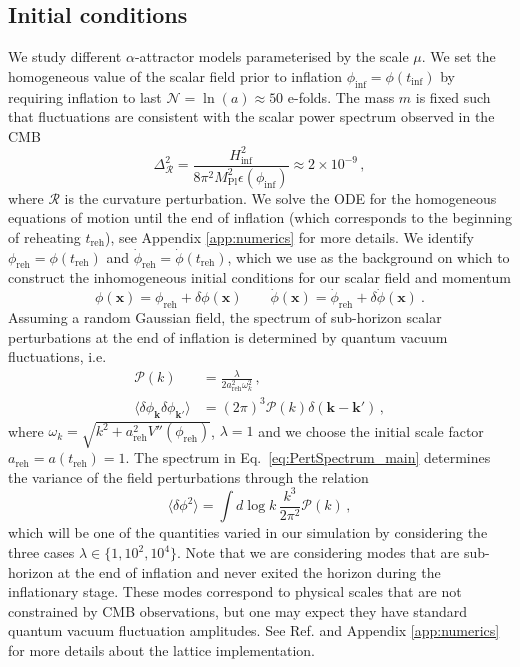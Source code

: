 \documentclass[
    reprint,
    preprintnumbers,
    superscriptaddress,
    nofootinbib,
     amsmath,amssymb,
     aps,
     prd,
    floatfix,
    ]{revtex4-2}
\newcommand{\mpl}{M_\mathrm{Pl}}
\newcommand{\reh}{_\mathrm{reh}}
\begin{document}
\subsection{Initial conditions}

We study different $\alpha$-attractor models parameterised by the scale $\mu$. We set the homogeneous value of the scalar field prior to inflation $\phi_\mathrm{inf}=\phi(t_\mathrm{inf})$ by requiring inflation to last $\mathcal{N}=\ln(a) \approx 50$ e-folds. The mass $m$ is fixed such that fluctuations are consistent with the scalar power spectrum observed in the CMB \cite{Planck:2018jri}
\begin{equation}
    \Delta_{\mathcal R}^2 = \frac{H_\mathrm{inf}^2}{8\pi^2 \mpl^2 \epsilon(\phi_\mathrm{inf})} \approx 2\times 10^{-9} \,,
\end{equation}
where $\mathcal{R}$ is the curvature perturbation.
We solve the ODE for the homogeneous equations of motion until the end of inflation (which corresponds to the beginning of reheating $t_\mathrm{reh}$), see Appendix \ref{app:numerics} for more details. We identify $\phi\reh = \phi(t\reh)$ and $\dot{\phi}\reh= \dot{\phi}(t\reh)$, which we use as the background on which to construct the inhomogeneous initial conditions for our scalar field and momentum
\begin{equation}
    \phi(\mathbf{x}) = \phi\reh + \delta\phi(\mathbf{x}) \qquad \dot{\phi}(\mathbf{x}) = \dot{\phi}\reh + \delta\dot{\phi}(\mathbf{x}) ~.
\end{equation}
Assuming a random Gaussian field, the spectrum of sub-horizon scalar perturbations at the end of inflation is determined by quantum vacuum fluctuations, i.e.
\begin{align}
\label{eq:PertSpectrum_main}
\mathcal{P}(k) &= \frac{\lambda}{2 a_\mathrm{reh}^2 \omega_k^2} \,, \\
\langle \delta\phi_\mathbf{k} \delta\phi_{\mathbf{k}'} \rangle &= (2\pi)^3 \mathcal{P}(k) \delta(\mathbf{k}-\mathbf{k}') \,,
\end{align}
where $\omega_k = \sqrt{k^2 + a_\mathrm{reh}^2 V''(\phi\reh)}$, $\lambda = 1$ and we choose the initial scale factor $a_\mathrm{reh}=a(t_\mathrm{reh})=1$. The spectrum in Eq.~\eqref{eq:PertSpectrum_main} determines the variance of the field perturbations through the relation
\begin{equation}
\langle \delta\phi^2 \rangle = \int d\log k \, \frac{k^3}{2 \pi^2} \mathcal{P}(k) \,,
\end{equation}
which will be one of the quantities varied in our simulation by considering the three cases $\lambda \in \{1, 10^2, 10^4\}$. Note that we are considering modes that are sub-horizon at the end of inflation and never exited the horizon during the inflationary stage.
These modes correspond to physical scales that are not constrained by CMB observations, but one may expect they have standard quantum vacuum fluctuation amplitudes. See Ref. \cite{Figueroa:2020rrl} and Appendix \ref{app:numerics} for more details about the lattice implementation.\\
\end{document}
